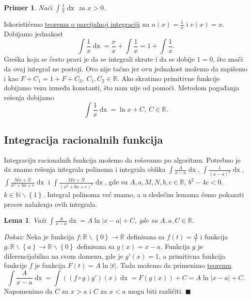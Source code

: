 \documentclass{article}
\newtheorem{lema}{Lema}[section]
\newtheorem{prim}{Primer}[section]
\DeclareMathOperator{\dx}{dx}
\begin{document}
\begin{primbox}
    \label{primer_1.14}
    \begin{prim}
        Naći $\displaystyle\int \frac{1}{x} \dx$ za $x > 0$.
    \end{prim}
    Iskoristićemo \hyperref[teorema_1.4]{teoremu o parcijalnoj integraciji} na $\displaystyle u\left(x\right)  = \frac{1}{x}$ i
    $v\left(x\right) = x$.
    Dobijamo jednakost
    $$\int \frac{1}{x} \dx = \frac{x}{x} + \int \frac{1}{x} = 1+ \int\frac{1}{x}.$$
    Greška koja se često pravi je da se integrali skrate i da se dobije $1 = 0$, što znači da ovaj integral ne postoji.
    Ovo nije tačno jer ovu jednakost možemo da zapišemo i kao $F+C_1 = 1+F+C_2,\ C_1,C_2\in\mathbb{R}$.
    Ako skratimo primitivne funkcije dobijamo vezu između konstanti, što nam nije od pomoći. Metodom pogađanja
    rešenja dobijamo $$\int\frac{1}{x}\dx=\ln x+C,\ C\in\mathbb{R}.$$
\end{primbox}

\subsection{Integracija racionalnih funkcija}

Integraciju racionalnih funkcija možemo da rešavamo po algoritmu.
Potrebno je da znamo rešenja integrala polinoma i integrala
oblika
$\displaystyle\int \frac{A}{x-a}\dx$, $\displaystyle\int\frac{1}{\left(x-a\right)^k}\dx$,
$\displaystyle\int \frac{Mx+N}{x^2+bx + c}\dx$ i $\displaystyle\int \frac{Mx + N}{\left(x^2 + bx + c\right)^k}\dx$,
gde su $A,a,M,N,b,c\in\mathbb{R}$, $b^2-4c<0$, $k\in\mathbb{N}\backslash\left\{1\right\}$.
Integral polinoma već znamo, a u sledećim lemama ćemo
pokazati proces nalaženja ovih integrala.

\begin{lemabox}
    \label{lema_1.1}
    \begin{lema}
        Važi $\displaystyle\int \frac{A}{x-a}\dx=A\ln|x-a| + C$, gde su $A,a,C\in \mathbb{R}$.
    \end{lema}
\end{lemabox}

\textit{Dokaz:} Neka je funkcija $f:\mathbb{R}\backslash\left\{0\right\}\longrightarrow\mathbb{R}$ definisana sa
$\displaystyle f\left(t\right)=\frac{A}{t}$ i funkcija $g:\mathbb{R}\backslash\left\{a\right\}\longrightarrow\mathbb{R}\backslash\left\{0\right\}$
definisana sa $g\left(x\right)=x-a$. Funkcija $g$ je diferencijabilna na svom domenu, gde je $g'\left(x\right)=1$, a primitivna funkcija
funkcije $f$ je funkcija $F\left(t\right)=A\ln|t|$. Tada možemo da primenimo \hyperref[teorema_1.2]{teoremu}.
$$ \int \frac{A}{x-a}\dx = \int \left(\left(f\circ g\right) g'\right)\left(x\right)\dx = F\left(g\left(x\right)\right) + C=A\ln|x-a| + C.$$
Napomenimo da $C$ za $x > a$ i $C$ za $x < a$ mogu biti različiti.
\null\hfill $\blacksquare$\par
\end{document}
